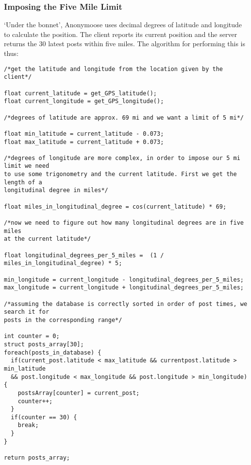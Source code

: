 \documentclass[12pt, a4paper]{article}
\begin{document}
\subsubsection{Imposing the Five Mile Limit}
`Under the bonnet', Anonymoose uses decimal degrees of latitude and longitude to calculate the position. The client reports its current position and the server returns the 30 latest posts within five miles. The algorithm for performing this is thus:
\begin{verbatim}
/*get the latitude and longitude from the location given by the client*/

float current_latitude = get_GPS_latitude();
float current_longitude = get_GPS_longitude();

/*degrees of latitude are approx. 69 mi and we want a limit of 5 mi*/ 

float min_latitude = current_latitude - 0.073;
float max_latitude = current_latitude + 0.073;

/*degrees of longitude are more complex, in order to impose our 5 mi limit we need
to use some trigonometry and the current latitude. First we get the length of a
longitudinal degree in miles*/

float miles_in_longitudinal_degree = cos(current_latitude) * 69;

/*now we need to figure out how many longitudinal degrees are in five miles
at the current latitude*/

float longitudinal_degrees_per_5_miles =  (1 / miles_in_longitudinal_degree) * 5;

min_longitude = current_longitude - longitudinal_degrees_per_5_miles;
max_longitude = current_longitude + longitudinal_degrees_per_5_miles;

/*assuming the database is correctly sorted in order of post times, we search it for
posts in the corresponding range*/

int counter = 0;
struct posts_array[30];
foreach(posts_in_database) {
  if(current_post.latitude < max_latitude && currentpost.latitude > min_latitude
  && post.longitude < max_longitude && post.longitude > min_longitude) {
    postsArray[counter] = current_post;
    counter++;
  }
  if(counter == 30) {
    break;
  }
}

return posts_array;

\end{verbatim}
\end{document}
